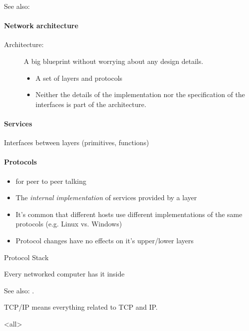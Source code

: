 See also: 

\paragraph{Network architecture}

\begin{description}
\item[Architecture:] A big blueprint without worrying about any design details.
  \begin{itemize}
  \item A set of layers and protocols
  \item Neither the details of the implementation nor the specification of the interfaces
    is part of the architecture.
  \end{itemize}
\end{description}
  
\paragraph{Services}

Interfaces between layers (primitives, functions)

\paragraph{Protocols}

\begin{itemize}
\item for peer to peer talking
\item The \emph{internal implementation} of services provided by a layer
\item It's common that different hosts use different implementations of the same protocols
  (e.g. Linux vs. Windows)
\item Protocol changes have no effects on it's upper/lower layers
\end{itemize}

\begin{frame}{{\tcpip{}} Protocol Stack}
  \begin{iblock}{Every networked computer has it inside}
    \begin{center}
    \end{center}
  \end{iblock}
\end{frame}

See also: .

TCP/IP means everything related to TCP and IP.

\mode<all>
